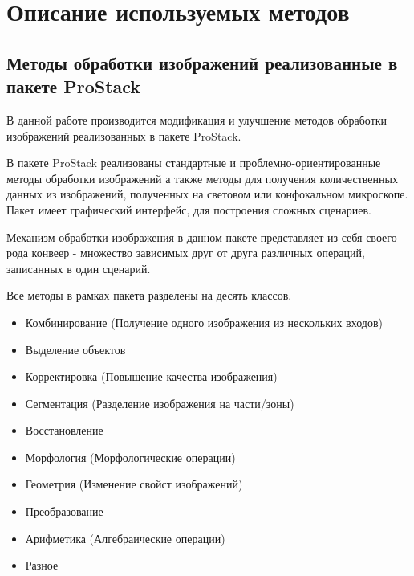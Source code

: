 \chapter{Описание используемых методов} \label{ch2}
	


\section{Методы обработки изображений реализованные в пакете ProStack} \label{ch2:title-abbr} %
В данной работе производится модификация и улучшение методов обработки изображений реализованных в пакете ProStack.\cite{Mastersthesis}

В пакете ProStack реализованы стандартные и проблемно-ориентированные методы
обработки изображений а также методы для получения количественных данных из изображений, полученных на световом или конфокальном микроскопе. Пакет имеет графический
интерфейс, для построения сложных сценариев. \cite{Article}

Механизм обработки изображения в данном пакете представляет из себя
своего рода конвеер - множество зависимых
друг от друга различных операций, записанных в один сценарий.

Все методы в рамках пакета разделены на десять классов.\cite{Article}
\begin{itemize}
	\item Комбинирование (Получение одного изображения из нескольких входов)
	\item Выделение объектов
	\item Корректировка (Повышение качества изображения)
	\item Сегментация (Разделение изображения на части/зоны)
	\item Восстановление
	\item Морфология (Морфологические операции)
	\item Геометрия (Изменение свойст изображений)
	\item Преобразование
	\item Арифметика (Алгебраические операции)
	\item Разное
\end{itemize}


